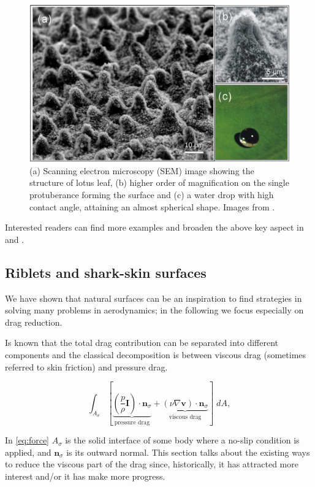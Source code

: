 \begin{figure}[h]
	\centering
	\includegraphics[width=0.6\linewidth]{chapter_1/lotus}
	\caption{(a) Scanning electron microscopy (SEM) image showing the structure of lotus leaf, (b) higher order of magnification on the single protuberance forming the surface and (c) a water drop with high contact angle, attaining an almost spherical shape. Images from \citet{stratakis2009laser}.}
	\label{fig:lotus}
\end{figure}

Interested readers can find more examples and broaden the above key aspect in \citet{bhushan2016biomimetics} and \citet{tropea2012nature}.

\subsection{Riblets and shark-skin surfaces}

We have shown that natural surfaces can be an inspiration to find strategies in solving many problems in aerodynamics; in the following we focus especially on drag reduction.

Is known that the total drag contribution can be separated into different components and the classical decomposition is between viscous drag (sometimes referred to skin friction) and pressure drag.

\begin{equation}
 \int_{A_{\sigma}}  [ \underbrace{\left( \frac{p}{\rho} \mathbf{I} \right) \cdot  \mathbf{n}_{\sigma} }_\text{pressure drag}  +  \underbrace{ \left( \nu \nabla \mathbf{v} \right) \cdot  \mathbf{n}_{\sigma}}_\text{viscous drag} ] \; dA,
 \label{eq:force}
\end{equation}

In \eqref{eq:force} $A_{\sigma}$ is the solid interface of some body where a no-slip condition is applied, and $ \mathbf{n}_{\sigma}$ is its outward normal.
This section talks about the existing ways to reduce the viscous part of the drag since, historically, it has attracted more interest and/or it has make more progress.

